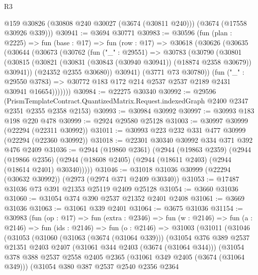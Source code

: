 \begin{lexlean}{R3}
\begin{coremodule}
      @159
      @30826
      (@30808 @240 @30027 (@3674 (@30811 @240)))
      (@3674 (@17558 @30926 @339)))
@30941 := @3694 @30771
@30983 := @30596
    (fun (plan : @2225) =>
    fun (base : @17) =>
    fun (row : @17) =>
    @30618
      (@30626
        (@30635
          (@30644
            (@30673
              (@30762
                (fun ("_" : @29551) =>
                @30783
                  (@30790
                    (@30801
                      (@30815
                        (@30821 (@30831 (@30843 (@30940 @30941)) (@18874 @2358 @30679)) @30941))
                      (@24352 @2355 @30680))
                    @30941)
                  (@3771 @73 @30780))
                (fun ("_" : @29550 @3783) =>
                @30772 @183 @172 @214 @2537 @2537 @2189 @2431 @30941 @16654)))))))
@30984 := @22275 @30340
@30992 := @29596
    (PrismTemplateContract.QuantizedMatrix.Request.indexedGraph @2400 @2347 @2351 @2355 @2358 @2153)
@30993 := @30984 @30992
@30997 := @30993 @183 @198 @220 @478
@30999 := @2924 @29580 @25128
@31003 := @30997 @30999 (@22294 (@22311 @30992))
@31011 := @30993 @223 @232 @331 @477 @30999 (@22294 (@22360 @30992))
@31018 := @22301 @30340 @30992 @334 @371 @392 @476 @2409
@31036 := @2944
    (@19860 @2361)
    (@2944
      (@19863 @2359)
      (@2944
        (@19866 @2356)
        (@2944 (@18608 @2405) (@2944 (@18611 @2403) (@2944 (@18614 @2401) @30340)))))
@31046 := @31018 @31036 @30999 (@22294 (@30632 @30992)) (@2973 (@2974 @371 @2409 @30340))
@31053 := @17487 @31036 @73 @391 @21353 @25119 @2409 @25128
@31054 := @3660 @31036
@31060 := @31054 @374 @390 @2537 @21352 @2401 @2408
@31061 := @3669 @31036
@31063 := @31061 @339 @2401
@31064 := @3675 @31036
@31154 := @30983
    (fun (op : @17) =>
    fun (extra : @2346) =>
    fun (w : @2146) =>
    fun (a : @2146) =>
    fun (ids : @2146) =>
    fun (o : @2146) =>
    @31003
      (@31011
        (@31046
          (@31053
            (@31060
              (@31063 (@3674 (@31064 @339)))
              (@31054
                @376
                @389
                @2537
                @21351
                @2403
                @2407
                (@31061 @344 @2403 (@3674 (@31064 @344)))
                (@31054
                  @378
                  @388
                  @2537
                  @2558
                  @2405
                  @2365
                  (@31061 @349 @2405 (@3674 (@31064 @349)))
                  (@31054
                    @380
                    @387
                    @2537
                    @2540
                    @2356
                    @2364

\end{coremodule}
\end{lexlean}
